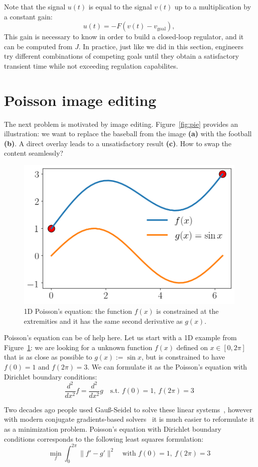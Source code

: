 \documentclass[notitlepage,oneside]{book}
\begin{document}

Note that the signal $u(t)$ is equal to the signal $v(t)$ up to a multiplication by a constant gain:
$$
u(t) = -F (v(t) - v_{\text{goal}}),
$$
This gain is necessary to know in order to build a closed-loop regulator, and it can be computed from $J$.
In practice, just like we did in this section,
engineers try different combinations of competing goals until they obtain a satisfactory transient time while not exceeding regulation capabilites.






\section{Poisson image editing}
\label{sec:poisson}
The next problem is motivated by image editing.
Figure~\ref{fig:pie} provides an illustration:
we want to replace the baseball from the image \textbf{(a)} with the football \textbf{(b)}. A direct overlay leads to a unsatisfactory result \textbf{(c)}.
How to swap the content seamlessly?

\begin{figure}[tb]
    \centering
    \includegraphics[width=.34\linewidth]{img/pie-1d.png}
    \caption{1D Poisson's equation: the function $f(x)$ is constrained at the extremities and it has the same second derivative as $g(x)$.}
    \label{fig:pie1d}
\end{figure}

Poisson's equation can be of help here. Let us start with a 1D example from Figure~\ref{fig:pie1d}: we are looking for a unknown function $f(x)$ defined on $x\in[0,2\pi]$ that is as close as possible to $g(x):=\sin x$, but is constrained to have $f(0)=1$ and $f(2\pi) = 3$.
We can formulate it as the Poisson's equation with Dirichlet boundary conditions:
$$
\frac{d^2}{dx^2}f  = \frac{d^2}{dx^2} g \quad \text{s.t.~} f(0)=1,~f(2\pi) = 3
$$

Two decades ago people used Gauß-Seidel to solve these linear systems~\cite{10.1145/882262.882269},
however with modern conjugate gradients-based solvers~\cite{OpenNL} it is much easier to reformulate it as a minimization problem.
Poisson's equation with Dirichlet boundary conditions corresponds to the following least squares formulation:
$$
\min\limits_{f} \int_0^{2\pi} \|f' - g'\|^2 \quad \text{with~} f(0)=1,~f(2\pi) = 3
$$
\end{document}
